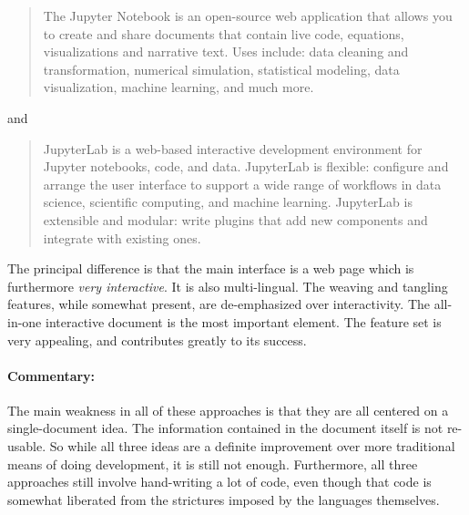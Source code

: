 \documentclass[sigconf,review]{acmart}
\begin{document}
\begin{quote}
The Jupyter Notebook is an open-source web application that allows you to
create and share documents that contain live code, equations, visualizations
and narrative text. Uses include: data cleaning and transformation, numerical
simulation, statistical modeling, data visualization, machine learning, and
much more.
\end{quote}
\noindent and
\begin{quote}
JupyterLab is a web-based interactive development environment for Jupyter
notebooks, code, and data. JupyterLab is flexible: configure and arrange the
user interface to support a wide range of workflows in data science, scientific
computing, and machine learning. JupyterLab is extensible and modular: write
plugins that add new components and integrate with existing ones.
\end{quote}
The principal difference is that the main interface is a web page
which is furthermore \emph{very interactive}. It is also multi-lingual.
The weaving and tangling features, while somewhat present, are de-emphasized
over interactivity. The all-in-one interactive document is the most
important element.  The feature set is very appealing, and contributes greatly
to its success.

\paragraph{Commentary:} The main weakness in all of these approaches is
that they are all centered on a single-document idea. The information
contained in the document itself is not re-usable. So while all three
ideas are a definite improvement over more traditional means of doing
development, it is still not enough. Furthermore, all three approaches
still involve hand-writing a lot of code, even though that code is
somewhat liberated from the strictures imposed by the languages themselves.
\end{document}
